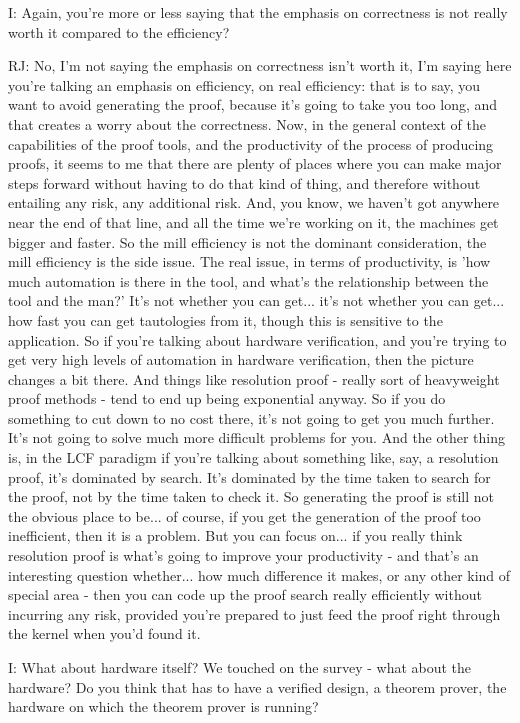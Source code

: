 \documentclass[10pt,titlepage]{book}
\begin{document}
I: Again, you're more or less saying that the emphasis on correctness is not really worth it compared to the efficiency?

RJ: No, I'm not saying the emphasis on correctness isn't worth it, I'm saying here you're talking an emphasis on efficiency, on real efficiency: that is to say, you want to avoid generating the proof, because it's going to take you too long, and that creates a worry about the correctness. Now, in the general context of the capabilities of the proof tools, and the productivity of the process of producing proofs, it seems to me that there are plenty of places where you can make major steps forward without having to do that kind of thing, and therefore without entailing any risk, any additional risk. And, you know, we haven't got anywhere near the end of that line, and all the time we're working on it, the machines get bigger and faster. So the mill efficiency is not the dominant consideration, the mill efficiency is the side issue. The real issue, in terms of productivity, is 'how much automation is there in the tool, and what's the relationship between the tool and the man?' It's not whether you can get... it's not whether you can get... how fast you can get tautologies from it, though this is sensitive to the application. So if you're talking about hardware verification, and you're trying to get very high levels of automation in hardware verification, then the picture changes a bit there. And things like resolution proof - really sort of heavyweight proof methods - tend to end up being exponential anyway. So if you do something to cut down to no cost there, it's not going to get you much further. It's not going to solve much more difficult problems for you. And the other thing is, in the LCF paradigm if you're talking about something like, say, a resolution proof, it's dominated by search. It's dominated by the time taken to search for the proof, not by the time taken to check it. So generating the proof is still not the obvious place to be... of course, if you get the generation of the proof too inefficient, then it is a problem. But you can focus on... if you really think resolution proof is what's going to improve your productivity - and that's an interesting question whether... how much difference it makes, or any other kind of special area - then you can code up the proof search really efficiently without incurring any risk, provided you're prepared to just feed the proof right through the kernel when you'd found it.

I: What about hardware itself? We touched on the survey - what about the hardware? Do you think that has to have a verified design, a theorem prover, the hardware on which the theorem prover is running?
\end{document}
